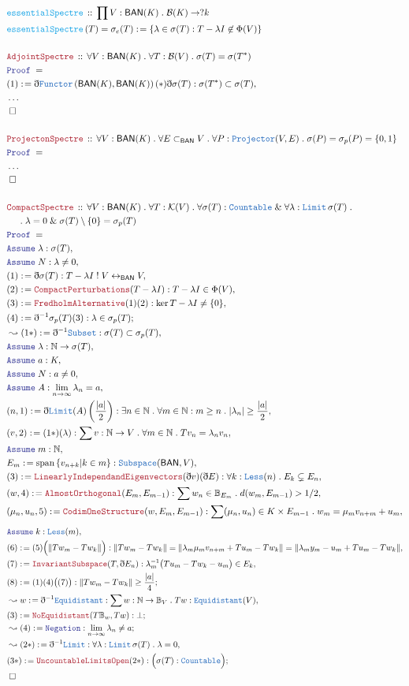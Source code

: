 \documentclass[12pt]{scrartcl}
\newcommand{\TYPE}[1]{\textcolor{NavyBlue}{\mathtt{#1}}}
\newcommand{\FUNC}[1]{\textcolor{Cerulean}{\mathtt{#1}}}
\newcommand{\LOGIC}[1]{\textcolor{Blue}{\mathtt{#1}}}
\newcommand{\THM}[1]{\textcolor{Maroon}{\mathtt{#1}}}
\renewcommand{\.}{\; . \;}
\newcommand{\de}{: \kern 0.1pc =}
\newcommand{\IsNot}{\; ! \;}
\newcommand{\Act}[1]{\left( #1 \right)}
\newcommand{\Theorem}[2]{& \THM{#1} \, :: \, #2 \\ & \Proof = \\ }
\newcommand{\DeclareFunc}[2]{& \FUNC{#1} \, :: \, #2 \\}
\newcommand{\DefineNamedFunc}[4]{&  \FUNC{#1}\Act{#2} = #3 \de #4 \\}
\newcommand{\NewLine}{\\ & \kern 1pc}
\newcommand{\Page}[1]{\begin{align*} #1 \end{align*} \newpage   }
\newcommand{ \bd }{ \ByDef }
\newcommand{\NoProof}{ & \ldots \\ \EndProof}
\renewcommand{\And}{\; \& \;}
\newcommand{\Nat}{\mathbb{N} }
\newcommand{\Func}[2]{\TYPE{Functor}\left( #1, #2 \right)}
\newcommand{\ToBij}{\leftrightarrow}
\newcommand{\Say}[3]{& #1 \de #2 : #3, \\}
\newcommand{\Conclude}[3]{& #1 \de #2 : #3; \\}
\newcommand{\Derive}[3]{& \leadsto #1 \de #2 : #3, \\}
\newcommand{\DeriveConclude}[3]{& \leadsto #1 \de #2 : #3 ; \\}
\newcommand{\A}{\LOGIC{Assume} \;}
\newcommand{\Assume}[2]{& \A #1 : #2, \\}
\newcommand{\QED}{\; \square}
\newcommand{\EndProof}{& \QED \\}
\newcommand{\ByDef}{\eth}
\newcommand{\Proof}{\LOGIC{Proof} \; }
\newcommand{\Ball}{ \mathbb{B} }
\DeclareMathOperator{\Span}{span}
\newcommand{\spec}{\sigma}
\newcommand{\BAN}{\mathsf{BAN}} %
\newcommand{\K}{\mathcal{K}} %
\newcommand{\B}{\mathcal{B}}
\renewcommand{\l}{\lambda}
\begin{document}
\Page{
	\DeclareFunc{essentialSpectre}{ \prod V : \BAN(K) \. \B(K) \to ?k}
	\DefineNamedFunc{essentialSpectre}{T}{\spec_e(T)}{\{ \l \in \spec(T) : T - \l I \not \in \Phi(V)  \}}
	\\
	\Theorem{AdjointSpectre}{\forall V : \BAN(K) \. \forall T : \B(V) \. \spec(T) = \spec(T^*)}
	\Say{(1)}{\bd \Func{\BAN(K)}{\BAN(K)}(*)\bd \spec(T)}{ \spec(T^*) \subset \spec(T)  }
	\NoProof
	\\
	\Theorem{ProjectonSpectre}{\forall V : \BAN(K) \.  
		\forall E \subset_{\BAN} V \. \forall P : \TYPE{Projector}(V,E) \. \spec(P) = \spec_p(P) = \{0,1\}}
	\NoProof
	\\
	\Theorem{CompactSpectre}{\forall V : \BAN(K) \. \forall T : \K(V) \. \forall \spec(T) : \TYPE{Countable} 
		\And \forall \l : \TYPE{Limit} \, \spec(T) \. 
		\NewLine \.
		\l = 0 \And \spec(T) \setminus \{0\} = \spec_p(T)   }
	\Assume{\l}{\spec(T)}
	\Assume{N}{ \l \neq 0}
	\Say{(1)}{\bd \spec(T)}{  T - \l I \IsNot V \ToBij_\BAN V }
	\Say{(2)}{\THM{CompactPerturbations}(T - \l I)}{ T - \l I \in \Phi(V)}
	\Say{(3)}{\THM{FredholmAlternative}(1)(2)}{\ker T - \l I \neq \{0\}}
	\Conclude{(4)}{ \bd^{-1} \spec_p(T)(3) }{ \l \in \spec_p(T)}
	\Derive{(1*)}{\bd^{-1} \TYPE{Subset}}{\spec(T) \subset \spec_p(T)}
	\Assume{\l}{\Nat \to \spec(T)}
	\Assume{a}{K}
	\Assume{N}{a \neq 0}
	\Assume{A}{\lim_{n \to \infty} \l_n  = a }
	\Say{ (n,1) }{ \bd \TYPE{Limit}(A)\left(\frac{|a|}{2}\right) }{ \exists n \in \Nat \. \forall m \in \Nat : m \ge n \. |\l_n| \ge \frac{|a|}{2} }
	\Say{(v,2)}{ (1*)(\l) }{ \sum v : \Nat \to V \. \forall m \in \Nat \. Tv_n = \l_n v_n}
	\Assume{m}{\Nat}
	\Say{E_m}{\Span\left\{ v_{n + k}  | k \in m  \right\}}{\TYPE{Subspace}(\BAN,V)}
	\Say{(3)}{\THM{LinearlyIndependandEigenvectors}(\bd v)(\bd E)}{ \forall k : \TYPE{Less}(n) \. E_k \subsetneq E_n }
	\Say{(w,4)}{\THM{AlmostOrthogonal}(E_m,E_{m - 1})}{ \sum w_n \in \Ball_{E_m} \. d(w_m,E_{m - 1}) > 1/2 }
	\Say{(\mu_n,u_n,5)}{\THM{CodimOneStructure}(w,E_m,E_{m-1})}{ \sum (\mu_n,u_n) \in K \times E_{m-1} \. w_m = \mu_m v_{n + m}  + u_m  }
	} \Page{
	\Assume{k}{\TYPE{Less}(m)}
	\Say{(6)}{(5)\Big( \|Tw_m -Tw_k\| \Big)}{ \| Tw_m - Tw_k  \| = \| \lambda_m \mu_m v_{n + m}  + Tu_m - Tw_k \| 
		= \| \l_m y_m - u_m + Tu_m - Tw_k\|}
	\Say{(7)}{ \THM{InvariantSubspace}(T,\bd E_n)  }{ \l^{-1}_m \big( Tu_m - Tw_k - u_m \big) \in E_k }
	\Conclude{(8)}{  (1)(4)\big((7)\big)  }{ \| Tw_m - Tw_k \| \ge  \frac{|a|}{4}   }
	\Derive{w}{\bd^{-1} \TYPE{Equidistant}}{ \sum w : \Nat \to \Ball_V \. Tw :  \TYPE{Equidistant}(V) }
	\Conclude{(3)}{\THM{NoEquidistant}(T\Ball_w,Tw)}{\bot}
	\DeriveConclude{(4)}{ \LOGIC{Negation}  }{\lim_{n \to \infty} \l_n \neq a}
	\Derive{(2*)}{\bd^{-1} \TYPE{Limit}}{\forall \l : \TYPE{Limit}\, \spec(T) \. \l = 0}
	\Conclude{(3*)}{\THM{UncountableLimitsOpen}(2*)}{ \Big(\spec(T) : \TYPE{Countable}\Big) }
	\EndProof
}
\end{document}
